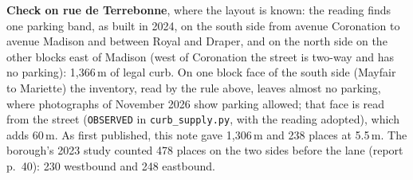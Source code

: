 \documentclass[11pt,a4paper]{article}
\begin{document}
\textbf{Check on rue de Terrebonne}, where the layout is known: the reading finds one parking band, as built in 2024, on the south side from avenue Coronation to avenue Madison and between Royal and Draper, and on the north side on the other blocks east of Madison (west of Coronation the street is two-way and has no parking): 1{,}366\,m of legal curb. On one block face of the south side (Mayfair to Mariette) the inventory, read by the rule above, leaves almost no parking, where photographs of November 2026 show parking allowed; that face is read from the street (\texttt{OBSERVED} in \texttt{curb\_supply.py}, with the reading adopted), which adds 60\,m. As first published, this note gave 1{,}306\,m and 238 places at 5.5\,m. The borough\textquoteright{}s 2023 study counted 478 places on the two sides before the lane (report p.~40): 230 westbound and 248 eastbound.
\end{document}
